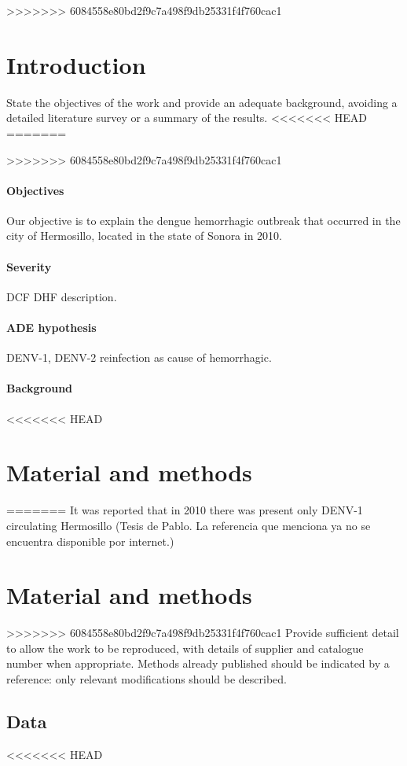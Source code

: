 \documentclass[draft, openbib]{imammb}
\numberwithin{equation}{section}
\begin{document}
>>>>>>> 6084558e80bd2f9c7a498f9db25331f4f760cac1
    \section{Introduction} \label{intro}
        State the objectives of the work and provide an adequate 
        background, avoiding a detailed literature survey or a 
        summary of the results.
<<<<<<< HEAD
%
=======

>>>>>>> 6084558e80bd2f9c7a498f9db25331f4f760cac1
        \paragraph{Objectives}
        Our objective is to explain the dengue hemorrhagic outbreak that 
     occurred in the city of Hermosillo, located in the state of Sonora in 2010.
    \paragraph{Severity}
    \ac{DCF} 
    \ac{DHF} description.
    \paragraph{ADE hypothesis}
     \ac{DENV-1}, \ac{DENV-2}
     reinfection as cause of hemorrhagic.
        \paragraph{Background}
<<<<<<< HEAD
        
    \section{Material and methods}
=======
            It was reported that in 2010 there was present only DENV-1 circulating
        Hermosillo (Tesis de Pablo. La referencia que menciona ya no se encuentra
        disponible por internet.)  
        \section{Material and methods}
>>>>>>> 6084558e80bd2f9c7a498f9db25331f4f760cac1
        Provide sufficient detail to allow the work to be 
        reproduced, with details of supplier and catalogue 
        number when appropriate. Methods already published 
        should be indicated by a reference: only relevant 
        modifications should be described.
        \subsection{Data}
<<<<<<< HEAD
\end{document}
